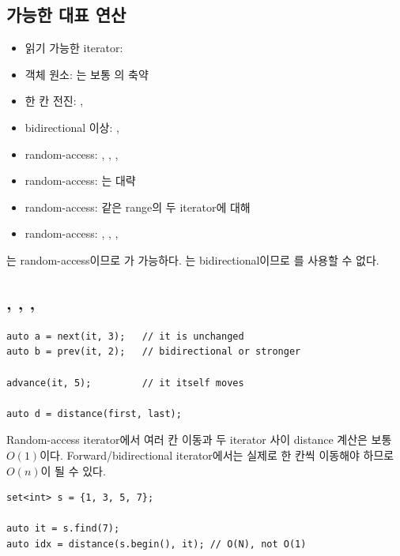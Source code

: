 \subsection{가능한 대표 연산}
\begin{itemize}
\item 읽기 가능한 iterator: 
\item 객체 원소: 는 보통 의 축약
\item 한 칸 전진: , 
\item bidirectional 이상: , 
\item random-access: , , , 
\item random-access: 는 대략 
\item random-access: 같은 range의 두 iterator에 대해 
\item random-access: , , , 
\end{itemize}

\begin{keybox}
는 random-access이므로 가 가능하다. 는 bidirectional이므로 를 사용할 수 없다.
\end{keybox}

\subsection{, , , }

\begin{lstlisting}
auto a = next(it, 3);   // it is unchanged
auto b = prev(it, 2);   // bidirectional or stronger

advance(it, 5);         // it itself moves

auto d = distance(first, last);
\end{lstlisting}

Random-access iterator에서 여러 칸 이동과 두 iterator 사이 distance 계산은 보통 $O(1)$이다. Forward/bidirectional iterator에서는 실제로 한 칸씩 이동해야 하므로 $O(n)$이 될 수 있다.

\begin{lstlisting}
set<int> s = {1, 3, 5, 7};

auto it = s.find(7);
auto idx = distance(s.begin(), it); // O(N), not O(1)
\end{lstlisting}

